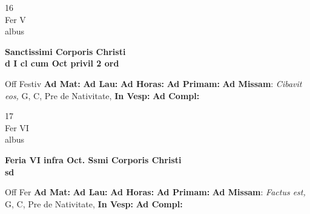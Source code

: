 \documentclass[10pt, openany]{book}
\begin{document}
        \begin{center}
            \begin{minipage}{3.5in}
                \vspace{2em}
                \begin{minipage}{0.5in}
                    {\Huge 16} \\
                    {\normalsize Fer V} \\
                    {\normalsize albus}
                \end{minipage}
                \begin{minipage}{3.0in}
                    \textbf{ \large Sanctissimi Corporis Christi \\
                    \textnormal{\normalsize d I cl cum Oct privil 2 ord}} \\ 
                \end{minipage}
                \begin{justify}Off Festiv
                    \textbf{Ad Mat: }
                    \textbf{Ad Lau: }
                    \textbf{Ad Horas: }
                    \textbf{Ad Primam: }\textbf{Ad Missam}: \textit{Cibavit eos,} G, C, Pre de Nativitate,  
                    \textbf{In Vesp: }
                    \textbf{Ad Compl: }
                \end{justify}
            \end{minipage}
        \end{center}
    
        \begin{center}
            \begin{minipage}{3.5in}
                \vspace{2em}
                \begin{minipage}{0.5in}
                    {\Huge 17} \\
                    {\normalsize Fer VI} \\
                    {\normalsize albus}
                \end{minipage}
                \begin{minipage}{3.0in}
                    \textbf{ \large Feria VI infra Oct. Ssmi Corporis Christi \\
                    \textnormal{\normalsize sd}} \\ 
                \end{minipage}
                \begin{justify}Off Fer
                    \textbf{Ad Mat: }
                    \textbf{Ad Lau: }
                    \textbf{Ad Horas: }
                    \textbf{Ad Primam: }\textbf{Ad Missam}: \textit{Factus est,} G, C, Pre de Nativitate,  
                    \textbf{In Vesp: }
                    \textbf{Ad Compl: }
                \end{justify}
            \end{minipage}
        \end{center}
    
\end{document}
